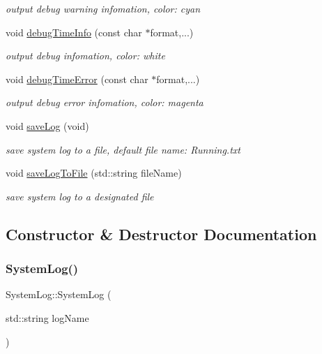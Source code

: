 \begin{DoxyCompactItemize}
\begin{DoxyCompactList}\small\item\em output debug warning infomation, color\+: cyan \end{DoxyCompactList}\item 
void \hyperlink{class_system_log_ad79238fdcc9a301093d6fa32884d1ae1}{debug\+Time\+Info} (const char $\ast$format,...)
\begin{DoxyCompactList}\small\item\em output debug infomation, color\+: white \end{DoxyCompactList}\item 
void \hyperlink{class_system_log_ae1cbe2de51efe22068e2e047396a72dd}{debug\+Time\+Error} (const char $\ast$format,...)
\begin{DoxyCompactList}\small\item\em output debug error infomation, color\+: magenta \end{DoxyCompactList}\item 
void \hyperlink{class_system_log_a9714a265975472433882962b7449bd45}{save\+Log} (void)
\begin{DoxyCompactList}\small\item\em save system log to a file, default file name\+: Running.\+txt \end{DoxyCompactList}\item 
void \hyperlink{class_system_log_af41d346f86242f5be187fe2be354347d}{save\+Log\+To\+File} (std\+::string file\+Name)
\begin{DoxyCompactList}\small\item\em save system log to a designated file \end{DoxyCompactList}\end{DoxyCompactItemize}


\subsection{Constructor \& Destructor Documentation}
\mbox{\label{class_system_log_aad41c68c3a8192ddb646170349023c99}} 
\subsubsection{\texorpdfstring{System\+Log()}{SystemLog()}}
{\footnotesize\ttfamily System\+Log\+::\+System\+Log (\begin{DoxyParamCaption}\item[{std\+::string}]{log\+Name }\end{DoxyParamCaption})}



